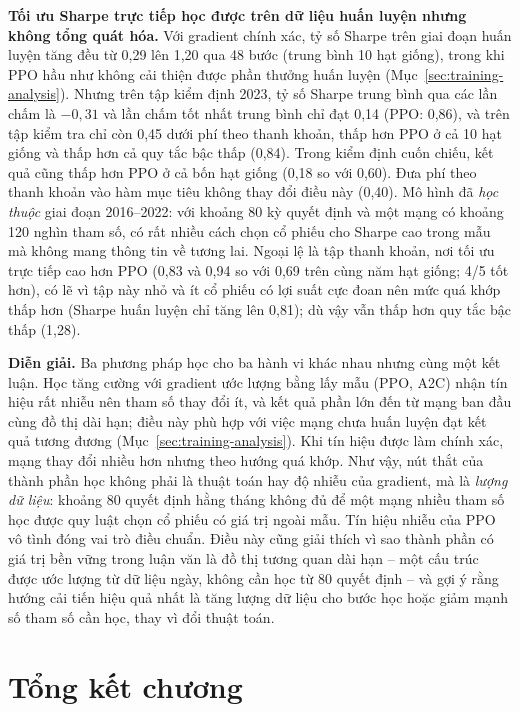 \textbf{Tối ưu Sharpe trực tiếp học được trên dữ liệu huấn luyện nhưng không tổng quát hóa.} Với gradient chính xác, tỷ số Sharpe trên giai đoạn huấn luyện tăng đều từ 0,29 lên 1,20 qua 48 bước (trung bình 10 hạt giống), trong khi PPO hầu như không cải thiện được phần thưởng huấn luyện (Mục~\ref{sec:training-analysis}). Nhưng trên tập kiểm định 2023, tỷ số Sharpe trung bình qua các lần chấm là $-0{,}31$ và lần chấm tốt nhất trung bình chỉ đạt 0,14 (PPO: 0,86), và trên tập kiểm tra chỉ còn 0,45 dưới phí theo thanh khoản, thấp hơn PPO ở cả 10 hạt giống và thấp hơn cả quy tắc bậc thấp (0,84). Trong kiểm định cuốn chiếu, kết quả cũng thấp hơn PPO ở cả bốn hạt giống (0,18 so với 0,60). Đưa phí theo thanh khoản vào hàm mục tiêu không thay đổi điều này (0,40). Mô hình đã \emph{học thuộc} giai đoạn 2016--2022: với khoảng 80 kỳ quyết định và một mạng có khoảng 120 nghìn tham số, có rất nhiều cách chọn cổ phiếu cho Sharpe cao trong mẫu mà không mang thông tin về tương lai. Ngoại lệ là tập thanh khoản, nơi tối ưu trực tiếp cao hơn PPO (0,83 và 0,94 so với 0,69 trên cùng năm hạt giống; 4/5 tốt hơn), có lẽ vì tập này nhỏ và ít cổ phiếu có lợi suất cực đoan nên mức quá khớp thấp hơn (Sharpe huấn luyện chỉ tăng lên 0,81); dù vậy vẫn thấp hơn quy tắc bậc thấp (1,28).

\textbf{Diễn giải.} Ba phương pháp học cho ba hành vi khác nhau nhưng cùng một kết luận. Học tăng cường với gradient ước lượng bằng lấy mẫu (PPO, A2C) nhận tín hiệu rất nhiễu nên tham số thay đổi ít, và kết quả phần lớn đến từ mạng ban đầu cùng đồ thị dài hạn; điều này phù hợp với việc mạng chưa huấn luyện đạt kết quả tương đương (Mục~\ref{sec:training-analysis}). Khi tín hiệu được làm chính xác, mạng thay đổi nhiều hơn nhưng theo hướng quá khớp. Như vậy, nút thắt của thành phần học không phải là thuật toán hay độ nhiễu của gradient, mà là \emph{lượng dữ liệu}: khoảng 80 quyết định hằng tháng không đủ để một mạng nhiều tham số học được quy luật chọn cổ phiếu có giá trị ngoài mẫu. Tín hiệu nhiễu của PPO vô tình đóng vai trò điều chuẩn. Điều này cũng giải thích vì sao thành phần có giá trị bền vững trong luận văn là đồ thị tương quan dài hạn -- một cấu trúc được ước lượng từ dữ liệu ngày, không cần học từ 80 quyết định -- và gợi ý rằng hướng cải tiến hiệu quả nhất là tăng lượng dữ liệu cho bước học hoặc giảm mạnh số tham số cần học, thay vì đổi thuật toán.

\section{Tổng kết chương}

